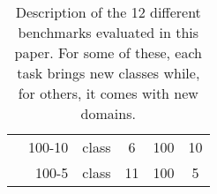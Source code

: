 \begin{table}[t]
\begin{adjustbox}{max width=\textwidth}
\begin{tabular}{@{}l|rcccc@{}}
                                        & 100-10                & class              & 6                      & 100                           & 10                                   \\
                                        & 100-5                 & class              & 11                     & 100                           & 5                                    \\
            \bottomrule
        \end{tabular}
    \end{adjustbox}
    \caption{Description of the 12 different benchmarks evaluated in this paper. For some of these, each task brings new classes while, for others, it comes with new domains.}
    \label{tab:seg_setting_description}
\end{table}
